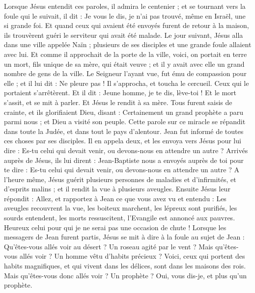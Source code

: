 \begin{multicols}{2}
Lorsque Jésus entendit ces paroles, il admira le centenier ; et se tournant vers la foule qui le suivait, il dit : Je vous le dis, je n'ai pas trouvé, même en Israël, une si grande foi.
Et quand ceux qui avaient été envoyés furent de retour à la maison, ils trouvèrent guéri le serviteur qui avait été malade.
Le jour suivant, Jésus alla dans une ville appelée Naïn ; plusieurs de ses disciples et une grande foule allaient avec lui.
Et comme il approchait de la porte de la ville, voici, on portait en terre un mort, fils unique de sa mère, qui était veuve ; et il y avait avec elle un grand nombre de gens de la ville.
Le Seigneur l’ayant vue, fut ému de compassion pour elle ; et il lui dit : Ne pleure pas !
Il s’approcha, et toucha le cercueil. Ceux qui le portaient s'arrêtèrent. Et il dit : Jeune homme, je te dis, lève-toi !
Et le mort s’assit, et se mit à parler. Et Jésus le rendit à sa mère.
Tous furent saisis de crainte, et ils glorifiaient Dieu, disant : Certainement un grand prophète a paru parmi nous ; et Dieu a visité son peuple.
Cette parole sur ce miracle se répandit dans toute la Judée, et dans tout le pays d’alentour.
Jean fut informé de toutes ces choses par ses disciples.
Il en appela deux, et les envoya vers Jésus pour lui dire : Es-tu celui qui devait venir, ou devons-nous en attendre un autre ?
Arrivés auprès de Jésus, ils lui dirent : Jean-Baptiste nous a envoyés auprès de toi pour te dire : Es-tu celui qui devait venir, ou devons-nous en attendre un autre ?
A l’heure même, Jésus guérit plusieurs personnes de maladies et d’infirmités, et d’esprits malins ; et il rendit la vue à plusieurs aveugles.
Ensuite Jésus leur répondit : Allez, et rapportez à Jean ce que vous avez vu et entendu : Les aveugles recouvrent la vue, les boiteux marchent, les lépreux sont purifiés, les sourds entendent, les morts ressuscitent, l'Evangile est annoncé aux pauvres.
Heureux celui pour qui je ne serai pas une occasion de chute !
Lorsque les messagers de Jean furent partis, Jésus se mit à dire à la foule au sujet de Jean : Qu'êtes-vous allés voir au désert ? Un roseau agité par le vent ?
Mais qu'êtes-vous allés voir ? Un homme vêtu d’habits précieux ? Voici, ceux qui portent des habits magnifiques, et qui vivent dans les délices, sont dans les maisons des rois.
Mais qu'êtes-vous donc allés voir ? Un prophète ? Oui, vous dis-je, et plus qu'un prophète.

\end{multicols}

